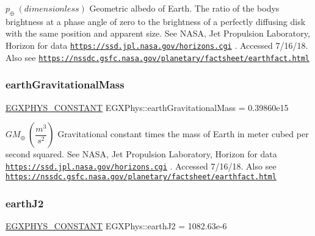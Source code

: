 $ p_{\oplus} \ (dimensionless)$ Geometric albedo of Earth. The ratio of the body\textquotesingle{}s brightness at a phase angle of zero to the brightness of a perfectly diffusing disk with the same position and apparent size. See N\+A\+SA, Jet Propulsion Laboratory, Horizon for data \href{https://ssd.jpl.nasa.gov/horizons.cgi}{\tt https\+://ssd.\+jpl.\+nasa.\+gov/horizons.\+cgi} . Accessed 7/16/18. Also see \href{https://nssdc.gsfc.nasa.gov/planetary/factsheet/earthfact.html}{\tt https\+://nssdc.\+gsfc.\+nasa.\+gov/planetary/factsheet/earthfact.\+html} \mbox{\label{group___e_g_x_phys-_constants-_astrophysics-_solar_system-_earth-_bulk_ga99e753870fd49d9d48c78c9467a34e25}} 
\subsubsection{\texorpdfstring{earth\+Gravitational\+Mass}{earthGravitationalMass}}
{\footnotesize\ttfamily \mbox{\hyperlink{group___e_g_x_phys-_constants-_macros_ga76980d288494ce1714c9ac68a95ba702}{E\+G\+X\+P\+H\+Y\+S\+\_\+\+C\+O\+N\+S\+T\+A\+NT}} E\+G\+X\+Phys\+::earth\+Gravitational\+Mass = 0.\+39860e15}

$ GM_{\oplus} \ (\dfrac{m^3}{s^2})$ Gravitational constant times the mass of Earth in meter cubed per second squared. See N\+A\+SA, Jet Propulsion Laboratory, Horizon for data \href{https://ssd.jpl.nasa.gov/horizons.cgi}{\tt https\+://ssd.\+jpl.\+nasa.\+gov/horizons.\+cgi} . Accessed 7/16/18. Also see \href{https://nssdc.gsfc.nasa.gov/planetary/factsheet/earthfact.html}{\tt https\+://nssdc.\+gsfc.\+nasa.\+gov/planetary/factsheet/earthfact.\+html} \mbox{\label{group___e_g_x_phys-_constants-_astrophysics-_solar_system-_earth-_bulk_ga8d661a52948229a59e9eabf97af51faf}} 
\subsubsection{\texorpdfstring{earth\+J2}{earthJ2}}
{\footnotesize\ttfamily \mbox{\hyperlink{group___e_g_x_phys-_constants-_macros_ga76980d288494ce1714c9ac68a95ba702}{E\+G\+X\+P\+H\+Y\+S\+\_\+\+C\+O\+N\+S\+T\+A\+NT}} E\+G\+X\+Phys\+::earth\+J2 = 1082.\+63e-\/6}

